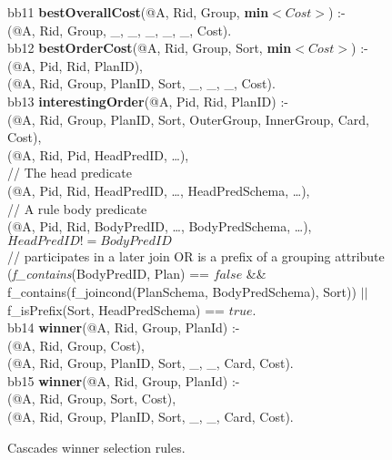 \begin{figure*}
\ssp
\centering
\begin{boxedminipage}{\linewidth}
bb11 {\bf bestOverallCost}(@A, Rid, Group, {\bf min}$<Cost>$) :- \\
(@A, Rid, Group, \_, \_, \_, \_, \_, Cost). \\

bb12 {\bf bestOrderCost}(@A, Rid, Group, Sort, {\bf min}$<Cost>$) :- \\
(@A, Pid, Rid, PlanID), \\
(@A, Rid, Group, PlanID, Sort, \_, \_, \_, Cost). \\

bb13 {\bf interestingOrder}(@A, Pid, Rid, PlanID) :- \\
(@A, Rid, Group, PlanID, Sort, OuterGroup, InnerGroup, Card, Cost), \\
(@A, Rid, Pid, HeadPredID, \ldots), \\
\datalogspace // The head predicate \\
(@A, Pid, Rid, HeadPredID, \ldots, HeadPredSchema, \ldots),\\
\datalogspace // A rule body predicate \\
(@A, Pid, Rid, BodyPredID, \ldots, BodyPredSchema, \ldots),\\
\datalogspace $HeadPredID != BodyPredID$ \\
\datalogspace // participates in a later join OR is a prefix of a grouping attribute \\ 
\datalogspace ({\em f\_contains}(BodyPredID, Plan) ==  $false$ \&\& \\
\datalogspace f\_contains(f\_joincond(PlanSchema, BodyPredSchema), Sort)) $||$ \\
\datalogspace f\_isPrefix(Sort, HeadPredSchema) ==  $true$.  \\

bb14 {\bf winner}(@A, Rid, Group, PlanId) :- \\
(@A, Rid, Group, Cost), \\
(@A, Rid, Group, PlanID, Sort, \_, \_, Card, Cost). \\

bb15 {\bf winner}(@A, Rid, Group, PlanId) :- \\
(@A, Rid, Group, Sort, Cost), \\
(@A, Rid, Group, PlanID, Sort, \_, \_, Card, Cost).

\end{boxedminipage}
\caption{\label{ch:opt:fig:cascades_winner} Cascades winner selection rules.}
\end{figure*}

